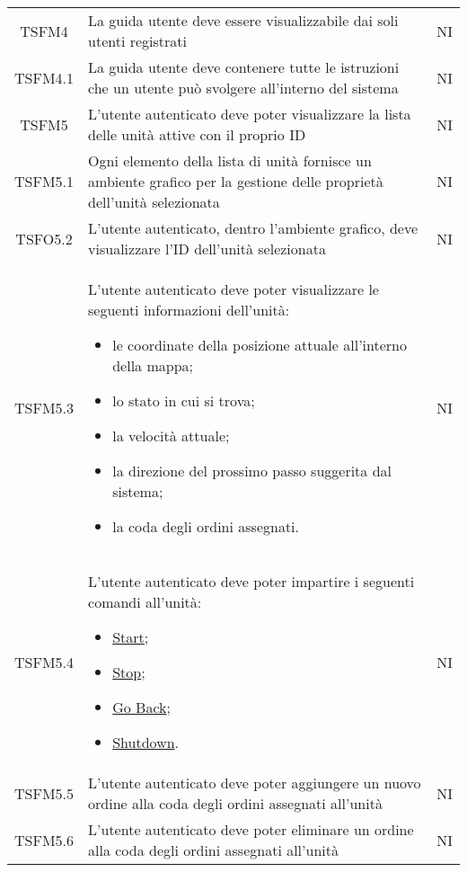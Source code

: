 \begin{longtable}[h!] { c  m{12cm} c}
		TSFM4   & La guida utente deve essere visualizzabile dai soli utenti registrati & NI \\
									
		TSFM4.1 & La guida utente deve contenere tutte le istruzioni che un utente può svolgere all'interno del sistema & NI \\
		
		TSFM5   & L'utente autenticato deve poter visualizzare la lista delle unità attive con il proprio ID & NI \\
		
		TSFM5.1 & Ogni elemento della lista di unità fornisce un ambiente grafico per la gestione delle proprietà dell'unità selezionata & NI \\
		
		TSFO5.2 & L'utente autenticato, dentro l'ambiente grafico, deve visualizzare l'ID dell'unità selezionata & NI \\
		
		TSFM5.3 & L'utente autenticato deve poter visualizzare le seguenti informazioni dell'unità:
					\begin{itemize}
						\item le coordinate della posizione attuale all'interno della mappa;
						\item lo stato in cui si trova;
						\item la velocità attuale;
						\item la direzione del prossimo passo suggerita dal sistema;
						\item la coda degli ordini assegnati.
					\end{itemize}	
									&NI\\
				
		TSFM5.4  & L'utente autenticato deve poter impartire i seguenti comandi all'unità:
					\begin{itemize}
						\item \underline{Start};
						\item \underline{Stop};
						\item \underline{Go Back};
						\item \underline{Shutdown}.
					\end{itemize}
									& NI \\
									
		TSFM5.5  & L'utente autenticato deve poter aggiungere un nuovo ordine alla coda degli ordini assegnati all'unità & NI\\
		
		TSFM5.6  & L'utente autenticato deve poter eliminare un ordine alla coda degli ordini assegnati all'unità & NI\\
		

\end{longtable}

